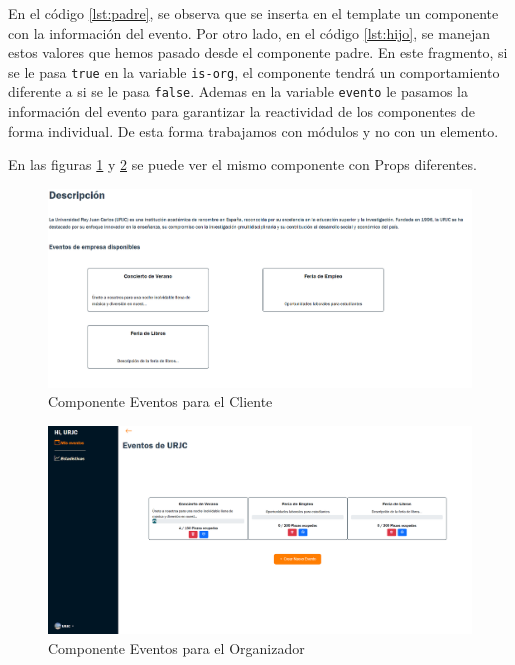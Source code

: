 En el código \ref{lst:padre}, se observa que se inserta en el template un componente con la información del evento. Por otro lado, en el código 
\ref{lst:hijo}, se manejan estos valores que hemos pasado desde el componente padre. En este fragmento, si se le pasa \texttt{true} en la variable 
\texttt{is-org}, el componente tendrá un comportamiento diferente a si se le pasa \texttt{false}. Ademas en la variable \texttt{evento} le pasamos la información
del evento para garantizar la reactividad de los componentes de forma individual. De esta forma trabajamos con módulos y no con un elemento.

\newpage
En las figuras \ref{fig:eventosCli} y \ref{fig:orgMain}  se puede ver el mismo componente con Props diferentes.
\begin{figure}[h]
    \centering
    \includegraphics[width=1\textwidth]{eventosCli.png} 
    \caption{Componente Eventos para el Cliente}
    \label{fig:eventosCli}
\end{figure}

\begin{figure}[h]
    \centering
    \includegraphics[width=1\textwidth]{orgMain.png} 
    \caption{Componente Eventos para el Organizador}
    \label{fig:orgMain}
\end{figure}


